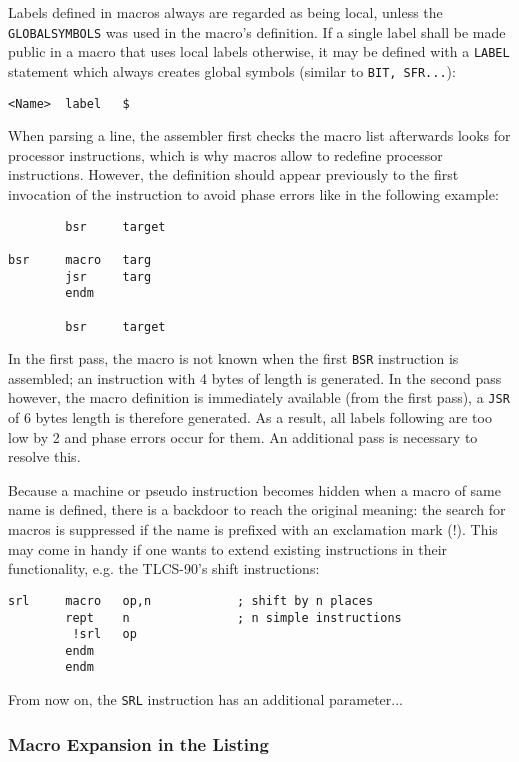 \documentclass[12pt,twoside]{report}
\newcommand{\tty}[1]{{\tt #1}}
\begin{document}
Labels defined in macros always are regarded as being local,
unless the \tty{GLOBALSYMBOLS} was used in the macro's
definition.  If a single label shall be made public in a macro
that uses local labels otherwise, it may be defined with a
\tty{LABEL} statement which always creates global symbols
(similar to \tty{BIT, SFR...}):
\begin{verbatim}
<Name>  label   $
\end{verbatim}
When parsing a line, the assembler first checks the macro list
afterwards looks for processor instructions, which is why macros
allow to redefine processor instructions.  However, the definition
should appear previously to the first invocation of the instruction
to avoid phase errors like in the following example:
\begin{verbatim}
        bsr     target

bsr     macro   targ
        jsr     targ
        endm

        bsr     target
\end{verbatim}
In the first pass, the macro is not known when the first \tty{BSR}
instruction is assembled; an instruction with 4 bytes of length is
generated.  In the second pass however, the macro definition is
immediately available (from the first pass), a \tty{JSR} of 6 bytes length
is therefore generated.  As a result, all labels following are too low
by 2 and phase errors occur for them.  An additional pass is
necessary to resolve this.

Because a machine or pseudo instruction becomes hidden when a macro
of same name is defined, there is a backdoor to reach the original
meaning: the search for macros is suppressed if the name is prefixed
with an exclamation mark (!).  This may come in handy if one wants to
extend existing instructions in their functionality, e.g. the
TLCS-90's shift instructions:
\begin{verbatim}
srl     macro   op,n            ; shift by n places
        rept    n               ; n simple instructions
         !srl   op
        endm
        endm
\end{verbatim}
From now on, the \tty{SRL} instruction has an additional parameter...

\subsubsection{Macro Expansion in the Listing}
\end{document}
